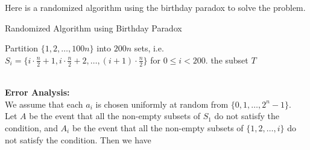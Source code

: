 \documentclass[a4paper, justified]{tufte-handout}
\begin{document}
\begin{solution}
  Here is a randomized algorithm using the birthday paradox to solve the problem.
  \begin{algorithm}
    \caption{Randomized Algorithm using Birthday Paradox}
    \begin{algorithmic}[1]
      \State Partition $\{1, 2, \ldots, 100n\}$ into $200n$ sets, i.e. $S_i = \{i \cdot \frac{n}{2} + 1, i \cdot \frac{n}{2} + 2, \ldots, (i+1) \cdot \frac{n}{2}\}$ for $0 \le i < 200$.
          \State \Return the subset $T$
          \EndIf
        \EndFor
      \EndFor
    \end{algorithmic}
  \end{algorithm}\\
  \textbf{Error Analysis:}\\
  We assume that each $a_i$ is chosen uniformly at random from $\{0, 1, \ldots, 2^n - 1\}$.\\
  Let $A$ be the event that all the non-empty subsets of $S_1$ do not satisfy the condition, and $A_i$ be the event that all the non-empty subsets of $\{1, 2, \ldots, i\}$ do not satisfy the condition. Then we have

\end{solution}
\end{document}
